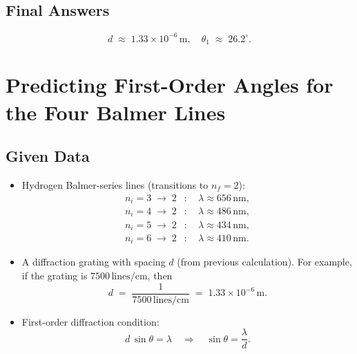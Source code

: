 \documentclass[12pt]{article}
\theoremstyle{definition} %
\theoremstyle{plain} %
\begin{document}
\subsection*{Final Answers}
\[
\boxed{
d \;\approx\; 1.33\times10^{-6}\,\text{m}, 
\quad
\theta_1 \;\approx\; 26.2^\circ.
}
\]

\section*{Predicting First-Order Angles for the Four Balmer Lines}

\subsection*{Given Data}
\begin{itemize}
  \item Hydrogen Balmer-series lines (transitions to $n_f = 2$):
    \[
      \begin{aligned}
      n_i = 3 \;\to\; 2 &: \quad \lambda \approx 656\,\text{nm},\\
      n_i = 4 \;\to\; 2 &: \quad \lambda \approx 486\,\text{nm},\\
      n_i = 5 \;\to\; 2 &: \quad \lambda \approx 434\,\text{nm},\\
      n_i = 6 \;\to\; 2 &: \quad \lambda \approx 410\,\text{nm}.
      \end{aligned}
    \]
  \item A diffraction grating with spacing $d$ (from previous calculation). 
    For example, if the grating is $7500\,\text{lines/cm}$, then
    \[
      d \;=\; \frac{1}{7500\,\text{lines/cm}}
             \;=\; 1.33 \times 10^{-6}\,\text{m}.
    \]
  \item First-order diffraction condition:
    \[
      d \,\sin\theta = \lambda
      \quad\Longrightarrow\quad
      \sin\theta = \frac{\lambda}{d}.
    \]
\end{itemize}
\end{document}
